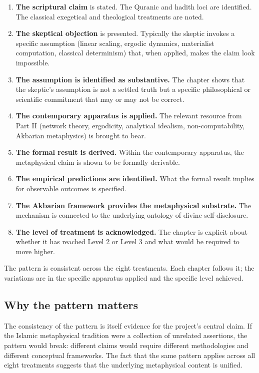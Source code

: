 \begin{enumerate}[leftmargin=2em]
    \item \textbf{The scriptural claim} is stated. The Quranic and
    hadith loci are identified. The classical exegetical and
    theological treatments are noted.
    \item \textbf{The skeptical objection} is presented. Typically
    the skeptic invokes a specific assumption (linear scaling,
    ergodic dynamics, materialist computation, classical
    determinism) that, when applied, makes the claim look
    impossible.
    \item \textbf{The assumption is identified as substantive.} The
    chapter shows that the skeptic's assumption is not a settled
    truth but a specific philosophical or scientific commitment
    that may or may not be correct.
    \item \textbf{The contemporary apparatus is applied.} The
    relevant resource from Part II (network theory, ergodicity,
    analytical idealism, non-computability, Akbarian metaphysics)
    is brought to bear.
    \item \textbf{The formal result is derived.} Within the
    contemporary apparatus, the metaphysical claim is shown to be
    formally derivable.
    \item \textbf{The empirical predictions are identified.} What
    the formal result implies for observable outcomes is
    specified.
    \item \textbf{The Akbarian framework provides the metaphysical
    substrate.} The mechanism is connected to the underlying
    ontology of divine self-disclosure.
    \item \textbf{The level of treatment is acknowledged.} The
    chapter is explicit about whether it has reached Level 2 or
    Level 3 and what would be required to move higher.
\end{enumerate}

The pattern is consistent across the eight treatments. Each
chapter follows it; the variations are in the specific apparatus
applied and the specific level achieved.

\subsection{Why the pattern matters}

The consistency of the pattern is itself evidence for the
project's central claim. If the Islamic metaphysical tradition
were a collection of unrelated assertions, the pattern would
break: different claims would require different methodologies and
different conceptual frameworks. The fact that the same pattern
applies across all eight treatments suggests that the underlying
metaphysical content is unified.

